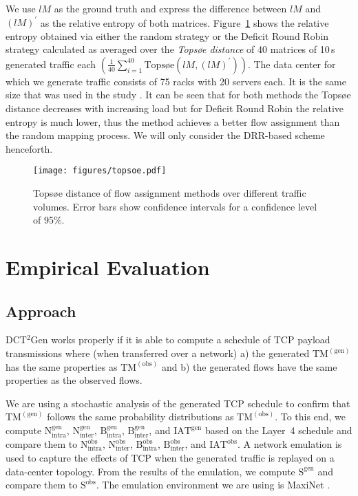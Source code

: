 \documentclass[journal,10pt]{IEEEtran}
\newcommand{\genname}{DCT${^2}$Gen}
\newcommand{\lf}{Layer~4}
\newcommand{\obstm}{\ensuremath{\mathrm{TM}^{(\mathrm{obs})}}}
\newcommand{\gentm}{\ensuremath{\mathrm{TM}^{(\mathrm{gen})}}}
\newcommand{\bytes}[2]{\ensuremath{\mathrm{B}^{\mathrm{#1}}_{\mathrm{#2}}}}
\newcommand{\partners}[2]{\ensuremath{\mathrm{N}^{\mathrm{#1}}_{\mathrm{#2}}}}
\newcommand{\iat}[1] {\ensuremath{\mathrm{IAT}^{\mathrm{#1}}}}
\newcommand{\size}[1]{\ensuremath{\mathrm{S}  ^{\mathrm{#1}}}}
\begin{document}
We use $lM$ as the ground truth and express the difference between $lM$ and $(lM)^{\prime}$ as the relative entropy of both matrices.
Figure~\ref{fig:entropy} shows the relative entropy obtained via either the random strategy or the Deficit Round Robin strategy
calculated as averaged over the \emph{Topsøe distance} of 40 matrices of 10\,s generated traffic each
$\left( \frac{1}{40} \sum_{i=1}^{40} \text{Topsøe}\left( lM, \left(lM\right)^{\prime} \right) \right)$.
The data center for which we generate traffic consists of 75 racks with 20 servers each.
It is the same size that was used in the study \cite{MSR-datacenters}.
It can be seen that for both methods the Topsøe distance decreases with increasing load but for Deficit Round Robin the relative entropy
is much lower, thus the method achieves a better flow assignment than the random mapping process.
We will only consider the DRR-based scheme henceforth.

		\begin{figure}
			\centering
				\texttt{[image: figures/topsoe.pdf]}
				\caption{Topsøe distance of flow assignment methods over different traffic volumes. Error bars show confidence intervals for a confidence level of 95\%.}
				\label{fig:entropy}
		\end{figure}


\section{Empirical Evaluation}

\label{sec:evaluation}
	\subsection{Approach}		


		\genname{} works properly if it is able to compute a schedule of TCP payload transmissions where (when transferred over a network)
		a) the generated \gentm{} has the same properties as \obstm{} and 
		b) the generated flows have the same properties as the observed flows.
		
		We are using a stochastic analysis of the generated TCP schedule to confirm that \gentm{}
		follows the same probability distributions as \obstm{}.
		To this end, we compute 
		\partners{gen}{intra}, \partners{gen}{inter}, \bytes{gen}{intra}, \bytes{gen}{inter}, and \iat{gen}
		based on the \lf{} schedule and compare them to
		\partners{obs}{intra}, \partners{obs}{inter}, \bytes{obs}{intra}, \bytes{obs}{inter}, and \iat{obs}.
		A network emulation is used to capture the effects of TCP when the generated traffic is replayed on a data-center topology.
		From the results of the emulation, we compute \size{gen} and compare them to \size{obs}.
		The emulation environment we are using is MaxiNet \cite{wette14b}.
		
\end{document}

